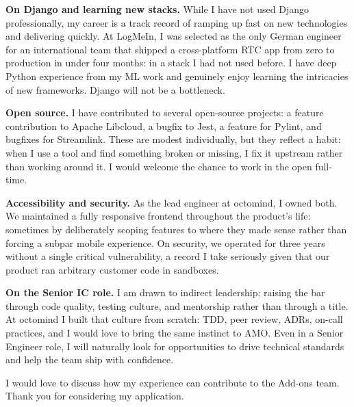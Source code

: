 \documentclass[8pt]{developercv}
\newcommand{\linebreaksmall}{\vspace{2mm}}
\begin{document}
\linebreaksmall

\textbf{On Django and learning new stacks.}
While I have not used Django professionally, my career is a track record of ramping up fast on new technologies and delivering quickly.
At LogMeIn, I was selected as the only German engineer for an international team that shipped a cross-platform RTC app from zero to production in under four months: in a stack I had not used before.
I have deep Python experience from my ML work and genuinely enjoy learning the intricacies of new frameworks.
Django will not be a bottleneck.

\linebreaksmall

\textbf{Open source.}
I have contributed to several open-source projects: a feature contribution to Apache Libcloud, a bugfix to Jest, a feature for Pylint, and bugfixes for Streamlink.
These are modest individually, but they reflect a habit: when I use a tool and find something broken or missing, I fix it upstream rather than working around it.
I would welcome the chance to work in the open full-time.

\linebreaksmall

\textbf{Accessibility and security.}
As the lead engineer at octomind, I owned both.
We maintained a fully responsive frontend throughout the product's life: sometimes by deliberately scoping features to where they made sense rather than forcing a subpar mobile experience.
On security, we operated for three years without a single critical vulnerability, a record I take seriously given that our product ran arbitrary customer code in sandboxes.

\linebreaksmall

\textbf{On the Senior IC role.}
I am drawn to indirect leadership: raising the bar through code quality, testing culture, and mentorship rather than through a title.
At octomind I built that culture from scratch: TDD, peer review, ADRs, on-call practices, and I would love to bring the same instinct to AMO.
Even in a Senior Engineer role, I will naturally look for opportunities to drive technical standards and help the team ship with confidence.

\vspace{0.3cm}

I would love to discuss how my experience can contribute to the Add-ons team.
Thank you for considering my application.
\end{document}
